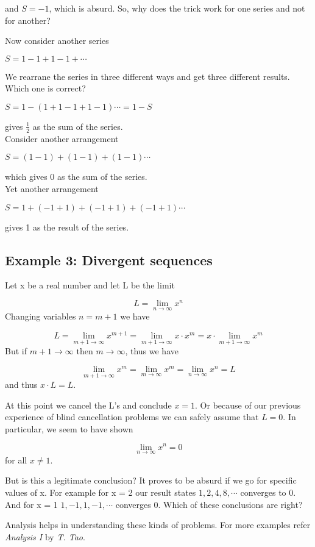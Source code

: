 \documentclass[10pt]{article}
\begin{document}
and \( S = -1 \), which is absurd. So, why does the trick work for one series
and not for another?\hfill
\break

Now consider another series
\begin{center}
  \( S = 1 - 1 + 1 - 1 + \cdots \)
\end{center}

We rearrane the series in three different ways and get three different
results. Which one is correct?

\begin{center}
  \( S = 1 - ( 1 + 1 - 1 + 1 - 1 ) \cdots = 1 - S \)
\end{center}
gives  \( \frac {1}{2} \) as the sum of the series.\\

Consider another arrangement
\begin{center}
  \( S = (1 - 1) + (1 - 1) + (1 - 1) \cdots \)
\end{center}
which gives 0 as the sum of the series.\\

Yet another arrangement
\begin{center}
  \( S = 1 + (- 1 + 1) + (- 1 + 1) + (- 1 + 1) \cdots \)
\end{center}
gives 1 as the result of the series.

\subsection*{Example 3: Divergent sequences}
Let x be a real number and let L be the limit

\[ L = \lim_{n\to\infty}x^n \]
Changing variables \( n = m + 1 \) we have

\[ L = \lim_{m+1\to\infty}x^{m+1} = \lim_{m+1\to\infty} x \cdot x^m = x \cdot
\lim_{m+1\to\infty}x^{m} \]
But if \( m + 1 \to \infty \) then \( m \to \infty \), thus we have

\[ \lim_{m+1\to\infty}x^{m} = \lim_{m\to\infty} x^m = \lim_{n\to\infty}x^{n} =
L \]
and thus \( x\cdot L = L \).

At this point we cancel the L's and conclude \( x = 1 \). Or because of our
previous experience of blind cancellation problems we can safely assume that \(L = 0\).
In particular, we seem to have shown

\[ \lim_{n\to\infty}x^{n} = 0 \] for all \(x \ne 1 \).

But is this a legitimate conclusion? It proves to be absurd if we go for
specific values of x. For example for x = 2 our result states \( 1, 2, 4, 8,
\cdots \) converges to 0. And for x = 1 \( 1, -1, 1, -1, \cdots \) converges
0. Which of these conclusions are right?

Analysis helps in understanding these kinds of problems. For more examples refer
{\em Analysis I} by {\em T. Tao}.
\end{document}
